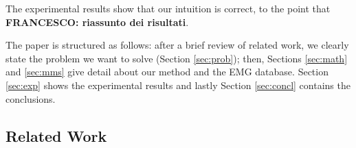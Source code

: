 The experimental results
show that our intuition is correct, to the point that
\textbf{FRANCESCO: riassunto dei risultati}.

The paper is structured as follows: after a brief review of related
work, we clearly state the problem we want to solve (Section
\ref{sec:prob}); then, Sections \ref{sec:math} and \ref{sec:mms} give
detail about our method and the EMG database. Section \ref{sec:exp}
shows the experimental results and lastly Section \ref{sec:concl}
contains the conclusions.

\subsection{Related Work}

